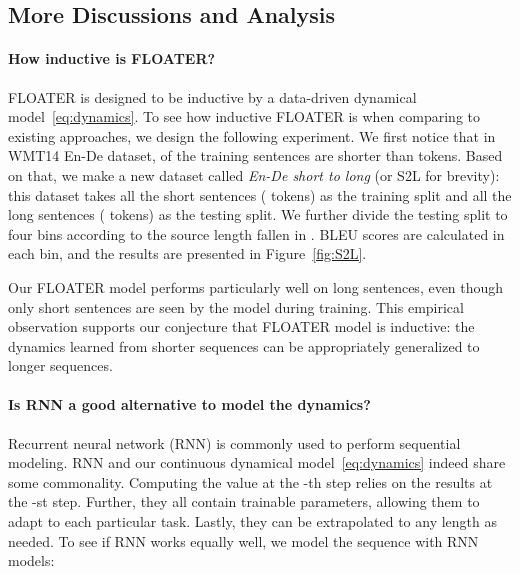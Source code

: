 \documentclass[11pt]{article}
\begin{document}
\subsection{More Discussions and Analysis}
\label{sec:exp-analysis}
\paragraph{How inductive is FLOATER?}
FLOATER is designed to be inductive by a data-driven dynamical model~\eqref{eq:dynamics}. To see how inductive FLOATER is when comparing to existing approaches, we design the following experiment. We first notice that in WMT14 En-De dataset,  of the training sentences are shorter than  tokens. Based on that, we make a new dataset called \emph{En-De short to long} (or S2L for brevity): this dataset takes all the short sentences ( tokens) as the training split and all the long sentences ( tokens) as the testing split. We further divide the testing split to four bins according to the source length fallen in . BLEU scores are calculated in each bin, and the results are presented in Figure~\ref{fig:S2L}. 

Our FLOATER model performs particularly well on long sentences, even though only short sentences are seen by the model during training. This empirical observation supports our conjecture that FLOATER model is inductive: the dynamics learned from shorter sequences can be appropriately generalized to longer sequences.

\paragraph{Is RNN a good alternative to model the dynamics?} 
Recurrent neural network (RNN) is commonly used to perform sequential modeling. RNN and our continuous dynamical model~\eqref{eq:dynamics} indeed share some commonality. Computing the value at the -th step relies on the results at the -st step. Further, they all contain trainable parameters, allowing them to adapt to each particular task. Lastly, they can be extrapolated to any length as needed. To see if RNN works equally well, we model the sequence   with RNN models:
\end{document}
